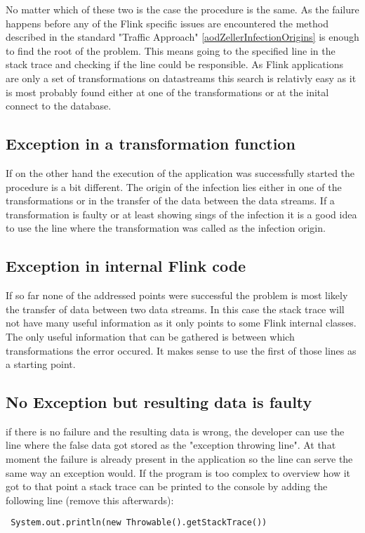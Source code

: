 No matter which of these two is the case the procedure is the same. As the failure happens before any of the Flink specific issues are encountered the method described in the standard "Traffic Approach" \ref{aodZellerInfectionOrigins} is enough to find the root of the problem. This means going to the specified line in the stack trace and checking if the line could be responsible. As Flink applications are only a set of transformations on datastreams this search is relativly easy as it is most probably found either at one of the transformations or at the inital connect to the database.

\subsection{Exception in a transformation function}
 If on the other hand the execution of the application was successfully started the procedure is a bit different. The origin of the infection lies either in one of the transformations or in the transfer of the data between the data streams. If a transformation is faulty or at least showing sings of the infection it is a good idea to use the line where the transformation was called as the infection origin.

\subsection{Exception in internal Flink code}
If so far none of the addressed points were successful the problem is most likely the transfer of data between two data streams. In this case the stack trace will not have many useful information as it only points to some Flink internal classes. The only useful information that can be gathered is between which transformations the error occured. It makes sense to use the first of those lines as a starting point.

\subsection{No Exception but resulting data is faulty}
if there is no failure and the resulting data is wrong, the developer can use the line where the false data got stored as the "exception throwing line". At that moment the failure is already present in the application so the line can serve the same way an exception would. If the program is too complex to overview how it got to that point a stack trace can be printed to the console by adding the following line (remove this afterwards):
\begin{lstlisting}
 System.out.println(new Throwable().getStackTrace())
\end{lstlisting}


